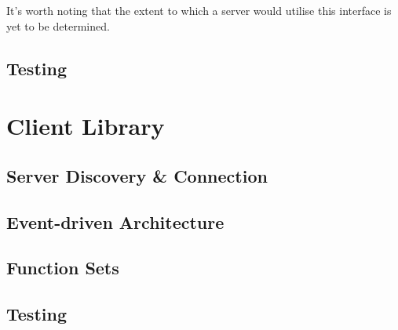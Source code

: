 It's worth noting that the extent to which a server would utilise this interface is yet to be determined.


\subsection{Testing}



\section{Client Library}

\subsection{Server Discovery \& Connection}

\subsection{Event-driven Architecture}

\subsection{Function Sets}

\subsection{Testing}









